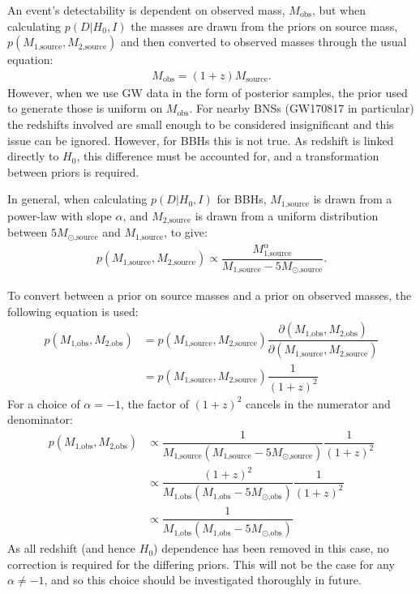 \documentclass[a4paper,10pt]{article}
\begin{document}
An event's detectability is dependent on observed mass, $M_{\text{obs}}$, but when calculating $p(D|H_0,I)$ the masses are drawn from the priors on source mass, $p(M_{\text{1,source}},M_{\text{2,source}})$ and then converted to observed masses through the usual equation:
\begin{equation}
\begin{aligned}
M_{\text{obs}} = (1+z)M_{\text{source}}.
\end{aligned}
\end{equation}
However, when we use GW data in the form of posterior samples, the prior used to generate those is uniform on $M_{\text{obs}}$.  For nearby BNSs (GW170817 in particular) the redshifts involved are small enough to be considered insignificant and this issue can be ignored.  However, for BBHs this is not true.  As redshift is linked directly to $H_0$, this difference must be accounted for, and a transformation between priors is required.

In general, when calculating $p(D|H_0,I)$ for BBHs, $M_{\text{1,source}}$ is drawn from a power-law with slope $\alpha$, and $M_{\text{2,source}}$ is drawn from a uniform distribution between $5M_{\odot\text{,source}}$ and $M_{\text{1,source}}$, to give:
\begin{equation}
\begin{aligned}
p(M_{\text{1,source}},M_{\text{2,source}}) \propto \dfrac{M_{\text{1,source}}^\alpha}{M_{\text{1,source}}-5M_{\odot\text{,source}}}.
\end{aligned}
\end{equation}

To convert between a prior on source masses and a prior on observed masses, the following equation is used:
\begin{equation}
\begin{aligned}
p(M_{\text{1,obs}},M_{\text{2,obs}}) &= p(M_{\text{1,source}},M_{\text{2,source}}) \dfrac{\partial(M_{\text{1,obs}},M_{\text{2,obs}})}{\partial(M_{\text{1,source}},M_{\text{2,source}})}
\\ &= p(M_{\text{1,source}},M_{\text{2,source}}) \dfrac{1}{(1+z)^2}
\end{aligned}
\end{equation}
For a choice of $\alpha=-1$, the factor of $(1+z)^2$ cancels in the numerator and denominator:
\begin{equation}
\begin{aligned}
p(M_{\text{1,obs}},M_{\text{2,obs}}) &\propto \dfrac{1}{M_{\text{1,source}}(M_{\text{1,source}}-5M_{\odot\text{,source}})} \dfrac{1}{(1+z)^2}
\\ &\propto \dfrac{(1+z)^2}{M_{\text{1,obs}}(M_{\text{1,obs}}-5M_{\odot\text{,obs}})} \dfrac{1}{(1+z)^2}
\\ &\propto \dfrac{1}{M_{\text{1,obs}}(M_{\text{1,obs}}-5M_{\odot\text{,obs}})}
\end{aligned}
\end{equation}
As all redshift (and hence $H_0$) dependence has been removed in this case, no correction is required for the differing priors.  This will not be the case for any $\alpha \neq -1$, and so this choice should be investigated thoroughly in future.
\end{document}
